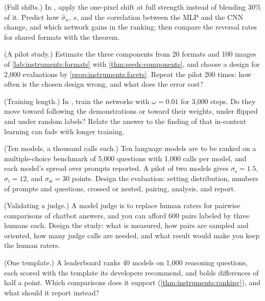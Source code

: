 \begin{refsection}
\begin{exercises}
\item \labwork (Full shifts.) In , apply the one-pixel shift at full strength instead of blending 30\% of it. Predict how $\hat\sigma_u$, $s$, and the correlation between the MLP and the CNN change, and which network gains in the ranking; then compare the reversal rates for shared formats with the theorem.\label{ex:instruments:shifts}

\item \labwork (A pilot study.) Estimate the three components from 20 formats and 100 images of \cref{lab:instruments:formats} with \cref{thm:seeds:components}, and choose a design for 2,000 evaluations by \cref{prop:instruments:facets}. Repeat the pilot 200 times: how often is the chosen design wrong, and what does the error cost?\label{ex:instruments:pilot}

\item \labwork (Training length.) In , train the networks with $\omega=0.01$ for 3,000 steps. Do they move toward following the demonstrations or toward their weights, under flipped and under random labels? Relate the answer to the finding of \textcite{SinghEtAl2023} that in-context learning can fade with longer training.\label{ex:instruments:length}

\item \design (Ten models, a thousand calls each.) Ten language models are to be ranked on a multiple-choice benchmark of 5,000 questions with 1,000 calls per model, and each model's spread over prompts reported. A pilot of two models gives $\sigma_{\mathrm s}=1.5$, $\sigma_{\mathrm i}=12$, and $\sigma_{\mathrm{si}}=30$ points. Design the evaluation: setting distribution, numbers of prompts and questions, crossed or nested, pairing, analysis, and report.\label{ex:instruments:design}

\item \design (Validating a judge.) A model judge is to replace human raters for pairwise comparisons of chatbot answers, and you can afford 600 pairs labeled by three humans each. Design the study: what is measured, how pairs are sampled and oriented, how many judge calls are needed, and what result would make you keep the human raters.\label{ex:instruments:judge}

\item \critique (One template.) A leaderboard ranks 40 models on 1,000 reasoning questions, each scored with the template its developers recommend, and bolds differences of half a point. Which comparisons does it support (\cref{thm:instruments:ranking}), and what should it report instead?\label{ex:instruments:critique1}


\end{exercises}
\end{refsection}
